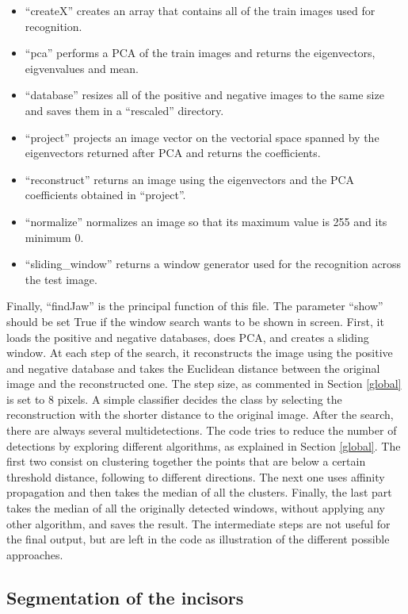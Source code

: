 \documentclass[a4paper,11pt,twoside]{article}
\begin{document}
\begin{itemize}
\item ``createX'' creates an array that contains all of the train images used for recognition.
\item ``pca'' performs a PCA of the train images and returns the eigenvectors, eigvenvalues and mean.
\item ``database'' resizes all of the positive and negative images to the same size and saves them in a ``rescaled'' directory.
\item ``project'' projects an image vector on the vectorial space spanned by the eigenvectors returned after  PCA and returns the coefficients.
\item ``reconstruct'' returns an image using the eigenvectors and the PCA coefficients obtained in ``project''.
\item ``normalize'' normalizes an image so that its maximum value is 255 and its minimum 0.
\item ``sliding\_window'' returns a window generator used for the recognition across the test image.
\end{itemize}

Finally, ``findJaw'' is the principal function of this file. The parameter ``show'' should be set True if the window search wants to be shown in screen. First, it loads the positive and negative databases, does PCA, and creates a sliding window. At each step of the search, it reconstructs the image using the positive and negative database and takes the Euclidean distance between the original image and the reconstructed one. The step size, as commented in Section \textsection\ref{global} is set to 8 pixels. A simple classifier  decides the class by selecting the reconstruction with the shorter distance to the original image. After the search, there are always several multidetections. The code tries to reduce the number of detections by exploring different algorithms, as explained in Section \textsection\ref{global}. The first two consist on clustering together the points that are below a certain threshold distance, following to different directions. The next one uses affinity propagation and then takes the median of all the clusters. Finally, the last part takes the median of all the originally detected windows, without applying any other algorithm, and saves the result. The intermediate steps are not useful for the final output, but are left in the code as illustration of the different possible approaches.

\subsection{Segmentation of the incisors}
\end{document}
